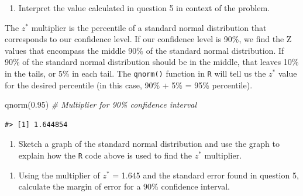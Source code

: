 \documentclass[
]{report}
\newenvironment{Shaded}{\begin{snugshade}}{\end{snugshade}}
\newcommand{\CommentTok}[1]{\textcolor[rgb]{0.56,0.35,0.01}{\textit{#1}}}
\newcommand{\FloatTok}[1]{\textcolor[rgb]{0.00,0.00,0.81}{#1}}
\newcommand{\FunctionTok}[1]{\textcolor[rgb]{0.00,0.00,0.00}{#1}}
\newcommand{\NormalTok}[1]{#1}
\providecommand{\tightlist}{%
  \setlength{\itemsep}{0pt}\setlength{\parskip}{0pt}}
\begin{document}
\begin{enumerate}
\def\labelenumi{\arabic{enumi}.}
\setcounter{enumi}{6}
\tightlist
\item
  Interpret the value calculated in question 5 in context of the problem.
\end{enumerate}

\vspace{1in}

\newpage

The \(z^*\) multiplier is the percentile of a standard normal distribution that corresponds to our confidence level. If our confidence level is 90\%, we find the Z values that encompass the middle 90\% of the standard normal distribution. If 90\% of the standard normal distribution should be in the middle, that leaves 10\% in the tails, or 5\% in each tail. The \texttt{qnorm()} function in \texttt{R} will tell us the \(z^*\) value for the desired percentile (in this case, 90\% + 5\% = 95\% percentile).

\begin{Shaded}
\begin{Highlighting}[]
\FunctionTok{qnorm}\NormalTok{(}\FloatTok{0.95}\NormalTok{) }\CommentTok{\# Multiplier for 90\% confidence interval}
\end{Highlighting}
\end{Shaded}

\begin{verbatim}
#> [1] 1.644854
\end{verbatim}

\begin{enumerate}
\def\labelenumi{\arabic{enumi}.}
\setcounter{enumi}{7}
\tightlist
\item
  Sketch a graph of the standard normal distribution and use the graph to explain how the \texttt{R} code above is used to find the \(z^*\) multiplier.
\end{enumerate}

\vspace{1.5in}

\begin{enumerate}
\def\labelenumi{\arabic{enumi}.}
\setcounter{enumi}{8}
\tightlist
\item
  Using the multiplier of \(z^*\) = 1.645 and the standard error found in question 5, calculate the margin of error for a 90\% confidence interval.
\end{enumerate}

\vspace{0.5in}
\end{document}
